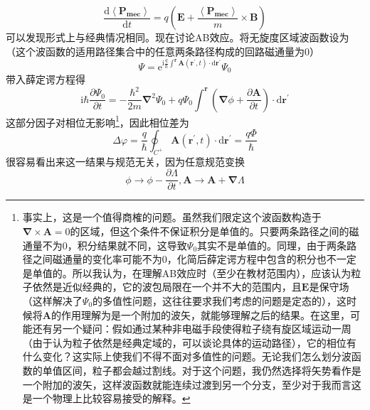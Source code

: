 \documentclass[12pt, a4paper, oneside]{ctexart}
\begin{document}
	\begin{equation}
	\dfrac{\mathrm{d}\left<\boldsymbol{P_{mec}}\right>}{\mathrm{d}t}=q\left(\boldsymbol{E}+\dfrac{\left<\boldsymbol{P_{mec}}\right>}{m}\times\boldsymbol{B}\right)
	\end{equation}
	\quad\quad 可以发现形式上与经典情况相同。现在讨论AB效应。将无旋度区域波函数设为（这个波函数的适用路径集合中的任意两条路径构成的回路磁通量为$0$）
	\begin{equation}
		\Psi=\mathrm{e}^{\mathrm{i}\frac{q}{\hbar}\int^{\boldsymbol{r}}\boldsymbol{A}(\boldsymbol{r^{\prime}},t)\cdot\mathrm{d}\boldsymbol{r^{\prime}}}\Psi_{0}
	\end{equation}
	\quad\quad 带入薛定谔方程得
	\begin{equation}
		\mathrm{i}\hbar\dfrac{\partial\Psi_{0}}{\partial t}=-\dfrac{\hbar^{2}}{2m}\boldsymbol{\nabla}^{2}\Psi_{0}+q\Psi_{0}\int^{\boldsymbol{r}}\left(\boldsymbol{\nabla}\phi+\dfrac{\partial\boldsymbol{A}}{\partial t}\right)\cdot\mathrm{d}\boldsymbol{r^{\prime}}
	\end{equation}
	\quad\quad 这部分因子对相位无影响\footnote{事实上，这是一个值得商榷的问题。虽然我们限定这个波函数构造于$\boldsymbol{\nabla}\times\boldsymbol{A}=0$的区域，但这个条件不保证积分是单值的。只要两条路径之间的磁通量不为$0$，积分结果就不同，这导致$\Psi_{0}$其实不是单值的。同理，由于两条路径之间磁通量的变化率可能不为$0$，化简后薛定谔方程中包含的积分也不一定是单值的。所以我认为，在理解AB效应时（至少在教材范围内），应该认为粒子依然是近似经典的，它的波包局限在一个并不大的范围内，且$\boldsymbol{E}$是保守场（这样解决了$\Psi_{0}$的多值性问题，这往往要求我们考虑的问题是定态的），这时候将$\boldsymbol{A}$的作用理解为是一个附加的波矢，就能够理解之后的结果。在这里，可能还有另一个疑问：假如通过某种非电磁手段使得粒子绕有旋区域运动一周（由于认为粒子依然是经典定域的，可以谈论具体的运动路径），它的相位有什么变化？这实际上使我们不得不面对多值性的问题。无论我们怎么划分波函数的单值区间，粒子都会越过割线。对于这个问题，我仍然选择将矢势看作是一个附加的波矢，这样波函数就能连续过渡到另一个分支，至少对于我而言这是一个物理上比较容易接受的解释。}，因此相位差为
	\begin{equation}
		\Delta\varphi=\dfrac{q}{\hbar}\oint_{C^{+}}\boldsymbol{A}(\boldsymbol{r^{\prime}},t)\cdot\mathrm{d}\boldsymbol{r^{\prime}}=\dfrac{q\Phi}{\hbar}
	\end{equation}
	\quad\quad 很容易看出来这一结果与规范无关，因为任意规范变换
	\begin{equation}
		\phi\to\phi-\dfrac{\partial\Lambda}{\partial t},\boldsymbol{A}\to\boldsymbol{A}+\boldsymbol{\nabla}\Lambda
	\end{equation}
\end{document}
